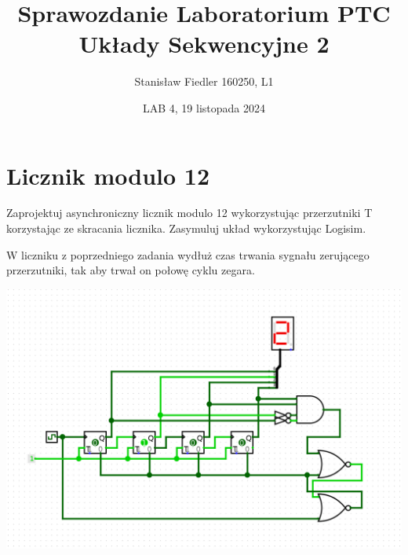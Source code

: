 \documentclass[a4paper, 11pt]{article}
\title{%
       \large Sprawozdanie Laboratorium PTC \\
       \huge Układy Sekwencyjne 2}
\author{Stanisław Fiedler 160250, L1}
\date{LAB 4, 19 listopada 2024}
\begin{document}
\maketitle

\section{Licznik modulo 12}\label{sec:licznik_modulo_} %

Zaprojektuj asynchroniczny licznik modulo 12 wykorzystując przerzutniki T korzystając ze
skracania licznika. Zasymuluj układ wykorzystując Logisim.



W liczniku z poprzedniego zadania wydłuż czas trwania sygnału zerującego przerzutniki, tak
aby trwał on połowę cyklu zegara.

\begin{center}
	\includegraphics[scale=0.35]{images/licznik.png}
\end{center}
\end{document}
